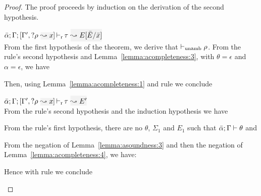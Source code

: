 \begin{proof}
The proof proceeds by induction on the derivation of the second hypothesis.
\begin{description}
\setlength{\itemsep}{1em}
\item[\fbox{\rref{L-Match}}]\quad
$\dlres{\bar\alpha}{\tenv}{\tenv',\envi{\rulet}{x}}{\type}{E[\bar{E}/\bar{x}]}$ \ \\

From the first hypothesis of the theorem, we derive that ${ \vdash_{\mathrm{unamb}} \rho}$. From the rule's second
hypothesis and Lemma~\ref{lemma:acompleteness:3}, with $\theta=\epsilon$ and
$\alpha=\epsilon$, we have
\begin{myequation*}
\end{myequation*}
Then, using Lemma~\ref{lemma:acompleteness:1} and rule  we conclude
\begin{myequation*}
\end{myequation*}

\item[\fbox{\rref{L-NoMatch}}]\quad
$\dlres{\bar\alpha}{\tenv}{\tenv',\envi{\rulet}{x}}{\type}{E'}$ \ \\

  From the rule's second hypothesis and the induction hypothesis we have
\begin{myequation*}
\end{myequation*}
From the rule's first hypothesis, there are no $\theta$, $\Sigma_1$ and $E_1$ such that
\({\bar\alpha; \Gamma \vdash \theta}\) and
\begin{myequation*}
\end{myequation*}
From the negation of Lemma~\ref{lemma:asoundness:3} and then the negation of
Lemma~\ref{lemma:acompleteness:4}, we have:
\begin{myequation*}
\end{myequation*}
  Hence with rule  we conclude
\begin{myequation*}
\end{myequation*}


\end{description}
\end{proof}

